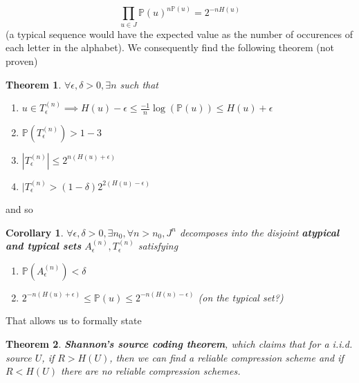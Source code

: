 \documentclass{article}
\newtheorem{corollary}{Corollary}
\newtheorem{theorem}{Theorem}
\theoremstyle{definition}
\begin{document}
\begin{equation}
  \prod_{u \in J} \mathbb{P}(u)^{n \mathbb{P}(u)} = 2^{-n H(u)}
\end{equation}
(a typical sequence would have the expected value as the number of occurences of
each letter in the alphabet). We consequently find the following theorem (not
proven)

\begin{theorem}
  $\forall \epsilon, \delta > 0, \exists n$ such that
  \begin{enumerate}
    \item $u \in T_\epsilon^{(n)} \implies H(u) - \epsilon \leq \frac{-1}{n}
      \log(\mathbb{P}(u)) \leq H(u) + \epsilon$
    \item $\mathbb{P}(T_\epsilon^{(n)}) > 1 - 3$
    \item $|T_\epsilon^{(n)}| \leq 2^{n(H(u) + \epsilon)}$
    \item $|T_\epsilon^{(n)} > (1 - \delta) 2^{2(H(u) - \epsilon)}$
  \end{enumerate}
\end{theorem}
  
and so

\begin{corollary}
  $\forall \epsilon, \delta > 0, \exists n_0, \forall n > n_0, J^n$ decomposes
  into the disjoint \textbf{atypical and typical sets} $A_\epsilon^{(n)},
  T_\epsilon^{(n)}$ satisfying
  \begin{enumerate}
    \item $\mathbb{P}(A_\epsilon^{(n)}) < \delta$
    \item $2^{-n(H(u) + \epsilon)} \leq \mathbb{P}(u) \leq 2^{-n(H(n) -
        \epsilon)}$ (on the typical set?)
  \end{enumerate}
\end{corollary}

That allows us to formally state

\begin{theorem}
  \textbf{Shannon's source coding theorem}, which claims that for a i.i.d.
  source $U$, if $R > H(U)$, then we can find a reliable compression scheme and
  if $R < H(U)$ there are no reliable compression schemes.
\end{theorem}
\end{document}
